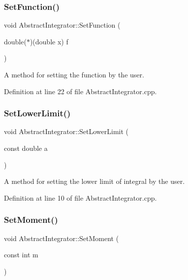\subsubsection{\texorpdfstring{Set\+Function()}{SetFunction()}}
{\footnotesize\ttfamily void Abstract\+Integrator\+::\+Set\+Function (\begin{DoxyParamCaption}\item[{double($\ast$)(double x)}]{f }\end{DoxyParamCaption})}



A method for setting the function by the user. 



Definition at line 22 of file Abstract\+Integrator.\+cpp.

\mbox{\label{class_abstract_integrator_aea1949bda48ee6f4501475e8da26aaeb}} 
\subsubsection{\texorpdfstring{Set\+Lower\+Limit()}{SetLowerLimit()}}
{\footnotesize\ttfamily void Abstract\+Integrator\+::\+Set\+Lower\+Limit (\begin{DoxyParamCaption}\item[{const double}]{a }\end{DoxyParamCaption})}



A method for setting the lower limit of integral by the user. 



Definition at line 10 of file Abstract\+Integrator.\+cpp.

\mbox{\label{class_abstract_integrator_a871fa27363ee09b98c964ccaa33da100}} 
\subsubsection{\texorpdfstring{Set\+Moment()}{SetMoment()}}
{\footnotesize\ttfamily void Abstract\+Integrator\+::\+Set\+Moment (\begin{DoxyParamCaption}\item[{const int}]{m }\end{DoxyParamCaption})}



